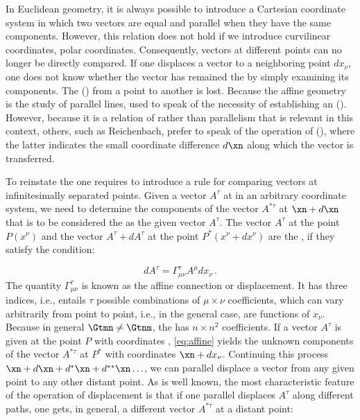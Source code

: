 In Euclidean geometry, it is always possible to introduce a Cartesian coordinate system in which two vectors are equal and parallel when they have the same components. However, this relation does not hold if we introduce curvilinear coordinates, \eg polar coordinates. Consequently, vectors at different points can no longer be directly compared. If one displaces a vector to a neighboring point $dx_\nu$, one does not know whether the vector has remained the  by simply examining its components. The  () from a point to another is lost. Because the affine geometry is the study of parallel lines, \citet{Weyl1918b} used to speak of the necessity of establishing an  (). However, because it is a relation of  rather than parallelism that is relevant in this context, others, such as Reichenbach, prefer to speak of the operation of  (), where the latter indicates the small coordinate difference $d\xn$ along which the vector is transferred. 


To reinstate the  one requires to introduce a rule for comparing vectors at infinitesimally separated points. Given a vector $A^\tau$ at \xn in an arbitrary coordinate system, we need to determine the components of the vector $A^{\ast\tau}$ at $\xn+d\xn$ that is to be considered the  as the given vector $A^\tau$. The vector $A^{\tau}$ at the point $P\left(x^{\nu}\right)$ and the vector $A^{\tau}+d A^{\tau}$ at the point $P^{\ast}\left(x^{\nu}+d x^{\nu}\right)$ are the , if they satisfy the condition:

\begin{equation}\label{eq:affine}
dA^\tau = \Gamma^\tau_{\mu\nu}A^{\mu} dx_\nu\,.
\end{equation}
%
The quantity $\Gamma^\tau_{\mu\nu}$ is known as the affine connection or displacement. It has three indices, i.e., entails $\tau$ possible combinations of $\mu \times \nu$ coefficients, which can vary arbitrarily from point to point, i.e., in the general case, are functions of $x_\nu$. Because in general $\Gtmn \neq \Gtnm$, the \Gtmn has $n \times n^2$ coefficients. If a vector $A^\tau$ is given at the point $P$ with coordinates \xn, \cref{eq:affine} yields the unknown components of the vector $A^{\ast\tau}$ at $P^*$ with coordinates $\xn+dx_\nu$. Continuing this process $
\xn+d\xn+d^{\ast} \xn+d^{\ast \ast} \xn \ldots$, we can parallel displace a vector from any given point to any other distant point. As is well known, the most characteristic feature of the operation of displacement is that if one parallel displaces $A^\tau$ along different paths, one gets, in general, a different vector $A^{\ast \tau}$ at a distant point:

